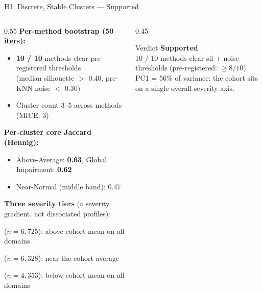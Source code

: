 \documentclass[aspectratio=169, 11pt]{beamer}
\begin{document}
\begin{frame}{H1: Discrete, Stable Clusters --- \textcolor{green!60!black}{Supported}}
  \begin{columns}[T]
    \begin{column}{0.55\textwidth}
      \textbf{Per-method bootstrap (50 iters):}
      \begin{itemize}
        \item \textbf{10 / 10} methods clear pre-registered thresholds\\
          (median silhouette $>$ 0.40, pre-KNN noise $<$ 0.30)
        \item Cluster count 3--5 across methods (MICE: 3)
      \end{itemize}

      \vspace{0.4em}
      \textbf{Per-cluster core Jaccard (Hennig):}
      \begin{itemize}
        \item Above-Average: \textbf{0.63}, Global Impairment: \textbf{0.62}
        \item Near-Normal (middle band): 0.47
      \end{itemize}

      \vspace{0.4em}
      \textbf{Three severity tiers} (a severity gradient, not dissociated profiles):
      \begin{description}\small
        \item[Above-Average] ($n = 6{,}725$): above cohort mean on all domains
        \item[Near-Normal] ($n = 6{,}328$): near the cohort average
        \item[Global Impairment] ($n = 4{,}353$): below cohort mean on all domains
      \end{description}
    \end{column}
    \begin{column}{0.45\textwidth}
      \begin{block}{Verdict}
        \textbf{Supported}\\[0.3em]
        10 / 10 methods clear sil + noise thresholds (pre-registered: $\ge 8/10$)\\[0.3em]
        PC1 = 56\% of variance: the cohort sits on a single overall-severity axis.
      \end{block}
    \end{column}
  \end{columns}
\end{frame}
\end{document}
